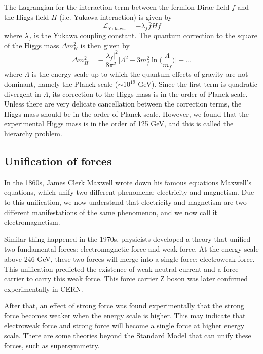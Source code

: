 The Lagrangian for the interaction term between the fermion Dirac field $f$ and the Higgs field $H$ (i.e. Yukawa interaction) is given by
\begin{equation}
\mathcal{L}_{\text{Yukawa}} = - \lambda_f \bar{f} H f
\end{equation}
where $\lambda_f$ is the Yukawa coupling constant.
The quantum correction to the square of the Higgs mass $\Delta m^2_H$ is then given by \cite{primer}
\begin{equation}
\Delta m^2_H = - \frac{|\lambda_f|^2}{8 \pi^2} \Big[ \Lambda^2 - 3 m_f^2 \ln \Big( \frac{\Lambda}{m_f} \Big) \Big] + \dots
\label{eq:higgs_correction}
\end{equation}
where $\Lambda$ is the energy scale up to which the quantum effects of gravity are not dominant, namely the Planck scale ($\sim 10^{19}$ GeV).
Since the first term is quadratic divergent in $\Lambda$, its correction to the Higgs mass is in the order of Planck scale.
Unless there are very delicate cancellation between the correction terms, the Higgs mass should be in the order of Planck scale.
However, we found that the experimental Higgs mass is in the order of 125 GeV, and this is called the hierarchy problem.

\subsection{Unification of forces}
In the 1860s, James Clerk Maxwell wrote down his famous equations Maxwell's equations, which unify two different phenomena: electricity and magnetism.
Due to this unification, we now understand that electricity and magnetism are two different manifestations of the same phenomenon, and we now call it electromagnetism.

Similar thing happened in the 1970s, physicists developed a theory that unified two fundamental forces: electromagnetic force and weak force.
At the energy scale above 246 GeV, these two forces will merge into a single force: electroweak force.
This unification predicted the existence of weak neutral current and a force carrier to carry this weak force.
This force carrier Z boson was later confirmed experimentally in CERN.

After that, an effect of strong force was found experimentally that the strong force becomes weaker when the energy scale is higher.
This may indicate that electroweak force and strong force will become a single force at higher energy scale.
There are some theories beyond the Standard Model that can unify these forces, such as supersymmetry.

